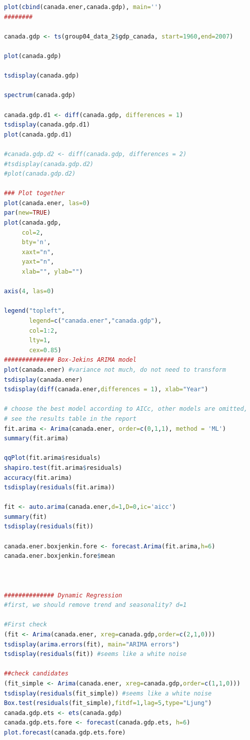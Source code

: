 \documentclass[journal, a4paper]{IEEEtran}
\begin{document}
\begin{appendix}
\begin{lstlisting}[language=R,basicstyle=\tiny]
plot(cbind(canada.ener,canada.gdp), main='')
########

canada.gdp <- ts(group04_data_2$gdp_canada, start=1960,end=2007)

plot(canada.gdp)

tsdisplay(canada.gdp)

spectrum(canada.gdp)

canada.gdp.d1 <- diff(canada.gdp, differences = 1)
tsdisplay(canada.gdp.d1)
plot(canada.gdp.d1)

#canada.gdp.d2 <- diff(canada.gdp, differences = 2)
#tsdisplay(canada.gdp.d2)
#plot(canada.gdp.d2)

### Plot together
plot(canada.ener, las=0)
par(new=TRUE)               
plot(canada.gdp,
     col=2,
     bty='n',               
     xaxt="n",               
     yaxt="n",              
     xlab="", ylab="")

axis(4, las=0)

legend("topleft",           
       legend=c("canada.ener","canada.gdp"), 
       col=1:2,
       lty=1,              
       cex=0.85)
############## Box-Jekins ARIMA model
plot(canada.ener) #variance not much, do not need to transform
tsdisplay(canada.ener)
tsdisplay(diff(canada.ener,differences = 1), xlab="Year")

# choose the best model according to AICc, other models are omitted, 
# see the results table in the report
fit.arima <- Arima(canada.ener, order=c(0,1,1), method = 'ML')
summary(fit.arima)

qqPlot(fit.arima$residuals)
shapiro.test(fit.arima$residuals)
accuracy(fit.arima)
tsdisplay(residuals(fit.arima))

fit <- auto.arima(canada.ener,d=1,D=0,ic='aicc')
summary(fit)
tsdisplay(residuals(fit))

canada.ener.boxjenkin.fore <- forecast.Arima(fit.arima,h=6)
canada.ener.boxjenkin.fore$mean



############## Dynamic Regression 
#first, we should remove trend and seasonality? d=1

#First check
(fit <- Arima(canada.ener, xreg=canada.gdp,order=c(2,1,0)))
tsdisplay(arima.errors(fit), main="ARIMA errors")
tsdisplay(residuals(fit)) #seems like a white noise

##check candidates
(fit_simple <- Arima(canada.ener, xreg=canada.gdp,order=c(1,1,0)))
tsdisplay(residuals(fit_simple)) #seems like a white noise
Box.test(residuals(fit_simple),fitdf=1,lag=5,type="Ljung")
canada.gdp.ets <- ets(canada.gdp)
canada.gdp.ets.fore <- forecast(canada.gdp.ets, h=6)
plot.forecast(canada.gdp.ets.fore)


\end{lstlisting}
\end{appendix}
\end{document}
